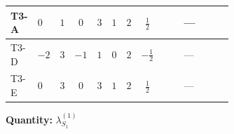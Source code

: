 \documentclass[8pt]{article}
\begin{document}
\begin{landscape}
\begin{longtable}{@{}llcccccc >{\raggedright\arraybackslash}p{0.21\linewidth} >{\raggedright\arraybackslash}p{0.21\linewidth} >{\raggedright\arraybackslash}p{0.21\linewidth}@{}}
\midrule
T3-A & $0$ & $1$ & $0$ & $3$ & $1$ & $2$ & $\frac{1}{2}$ & \scriptsize\adjustbox{max width=\linewidth}{$\begin{gathered} +4 {\lambda_{HS_1}^{(1)}}^2\end{gathered}$} & --- & \scriptsize\adjustbox{max width=\linewidth}{$\begin{gathered} +10 {\lambda_{S_1}^{(1)}}^2\end{gathered}$} \\
\midrule
T3-D & $-2$ & $3$ & $-1$ & $1$ & $0$ & $2$ & $-\frac{1}{2}$ & \scriptsize\adjustbox{max width=\linewidth}{$\begin{gathered} +4 {\lambda_{HS_1}^{(1)}}^2\end{gathered}$} & --- & \scriptsize\adjustbox{max width=\linewidth}{$\begin{gathered} +14 {\lambda_{S_1}^{(1)}}^2\end{gathered}$} \\
\midrule
T3-E & $0$ & $3$ & $0$ & $3$ & $1$ & $2$ & $\frac{1}{2}$ & \scriptsize\adjustbox{max width=\linewidth}{$\begin{gathered} +4 {\lambda_{HS_1}^{(1)}}^2\end{gathered}$} & --- & \scriptsize\adjustbox{max width=\linewidth}{$\begin{gathered} +14 {\lambda_{S_1}^{(1)}}^2\end{gathered}$} \\
\midrule
\bottomrule
\end{longtable}
\clearpage
\noindent\textbf{Quantity: }$\lambda_{S_1}^{(1)}$\par\smallskip

\end{landscape}
\end{document}
